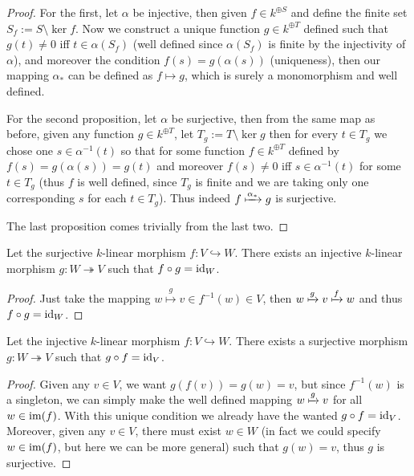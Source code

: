 \begin{proof}
  For the first, let \(\alpha\) be injective, then given \(f \in k^{\oplus S}\)
  and define the finite set \(S_f := S \setminus \ker f\). Now we construct a
  unique function \(g \in k^{\oplus T}\) defined such that \(g(t) \neq 0\) iff
  \(t \in \alpha(S_f)\) (well defined since \(\alpha(S_f)\) is finite by the
  injectivity of \(\alpha\)), and moreover the condition \(f(s) =
  g(\alpha(s))\) (uniqueness), then our mapping \(\alpha_{\ast}\) can be
  defined as \(f \mapsto g\), which is surely a monomorphism and well defined.

  For the second proposition, let \(\alpha\) be surjective, then from the same
  map as before, given any function \(g \in k^{\oplus T}\), let  \(T_g := T
  \setminus \ker g\) then for every \(t \in T_g\) we chose one \(s \in
  \alpha^{-1}(t)\) so that for some function \(f \in k^{\oplus T}\) defined by
  \(f(s) = g(\alpha(s)) = g(t)\) and moreover \(f(s) \neq 0\) iff \(s \in
  \alpha^{-1}(t)\) for some \(t \in T_g\) (thus \(f\) is well defined, since
  \(T_g\) is finite and we are taking only one corresponding \(s\) for each \(t
  \in T_g\)). Thus indeed \(f \xmapsto{\alpha_\ast} g\) is surjective.

  The last proposition comes trivially from the last two.
\end{proof}

\begin{proposition}
  Let the surjective \(k\)-linear morphism \(f: V \hookrightarrow W\). There
  exists an injective \(k\)-linear morphism \(g: W \twoheadrightarrow V\) such
  that \(f \circ g = \operatorname{id}_{W}\).
\end{proposition}

\begin{proof}
  Just take the mapping \(w \overset g \longmapsto v \in f^{-1}(w) \in V\), then
  \(w \xmapsto g v \xmapsto f w\) and thus \(f \circ g = \operatorname{id}_W\).
\end{proof}

\begin{proposition}
  Let the injective \(k\)-linear morphism \(f: V \hookrightarrow W\). There
  exists a surjective morphism \(g : W \twoheadrightarrow V\) such that \(g
  \circ f = \operatorname{id}_V\).
\end{proposition}

\begin{proof}
  Given any \(v \in V\), we want \(g(f(v)) = g(w) = v\), but since \(f^{-1}(w)\)
  is a singleton, we can simply make the well defined mapping \(w \xmapsto g v\)
  for all \(w \in \operatorname{im}(f)\). With this unique condition we already have the
  wanted \(g \circ f = \operatorname{id}_V\). Moreover, given any \(v \in V\), there must
  exist \(w \in W\) (in fact we could specify \(w \in \operatorname{im}(f)\), but here we can
  be more general) such that \(g(w) = v\), thus \(g\) is surjective.
\end{proof}

